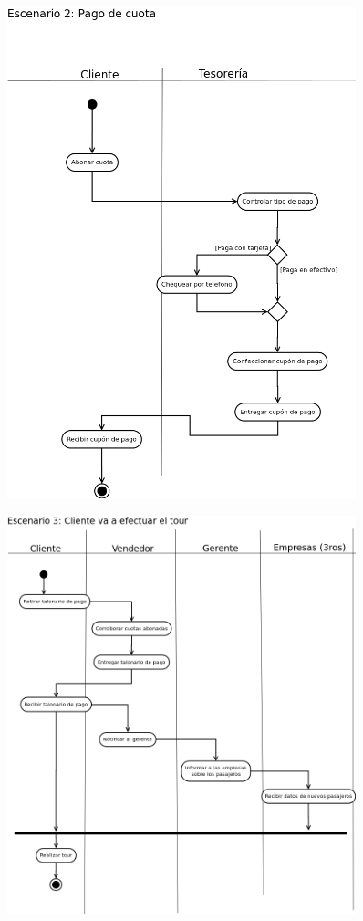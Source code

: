 \documentclass[12pt,a4paper,titlepage,oneside]{article}
\begin{document}
\begin{figure}[htb]
\centerline{\includegraphics[width=0.9\textwidth]{escenario2}}
\label{fig:celda}
\end{figure}

\begin{figure}[htb]
\centerline{\includegraphics[width=0.9\textwidth]{escenario3}}
\label{fig:celda}
\end{figure}
\end{document}
